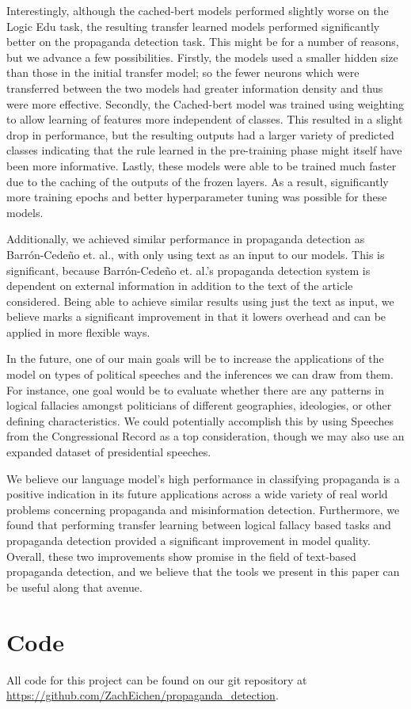 \documentclass[conference]{IEEEtran}
\begin{document}
Interestingly, although the cached-bert models performed slightly worse on the Logic Edu task, the resulting transfer learned models performed significantly better on the propaganda detection task. This might be for a number of reasons, but we advance a few possibilities. Firstly, the models used a smaller hidden size than those in the initial transfer model; so the fewer neurons which were transferred between the two models had greater information density and thus were more effective. Secondly, the Cached-bert model was trained using weighting to allow learning of features more independent of classes. This resulted in a slight drop in performance, but the resulting outputs had a larger variety of predicted classes indicating that the rule learned in the pre-training phase might itself have been more informative. Lastly, these models were able to be trained much faster due to the caching of the outputs of the frozen layers. As a result, significantly more training epochs and better hyperparameter tuning was possible for these models. 

Additionally, we achieved similar performance in propaganda detection as Barrón-Cedeño et. al.\cite{Proppy}, with only using text as an input to our models. This is significant, because Barrón-Cedeño et. al.'s propaganda detection system is dependent on external information in addition to the text of the article considered. Being able to achieve similar results using just the text as input, we believe marks a significant improvement in that it lowers overhead and can be applied in more flexible ways.

In the future, one of our main goals will be to increase the applications of the model on types of political speeches and the inferences we can draw from them. For instance, one goal would be to evaluate whether there are any patterns in logical fallacies amongst politicians of different geographies, ideologies, or other defining characteristics. We could potentially accomplish this by using Speeches from the Congressional Record \cite{gentzkow18} as a top consideration, though we may also use an expanded dataset of presidential speeches.

We believe our language model's high performance in classifying propaganda is a positive indication in its future applications across a wide variety of real world problems concerning propaganda and misinformation detection. Furthermore, we found that performing transfer learning between logical fallacy based tasks and propaganda detection provided a significant improvement in model quality. Overall, these two improvements show promise in the field of text-based propaganda detection, and we believe that the tools we present in this paper can be useful along that avenue. 

\section{Code} 
All code for this project can be found on our git repository at \url{https://github.com/ZachEichen/propaganda_detection}.

{%
%
\normalsize}
\end{document}
